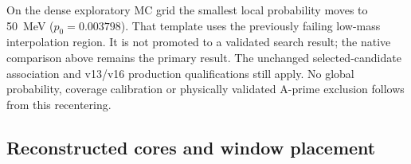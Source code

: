 On the dense exploratory MC grid the smallest local probability moves
to 50~MeV ($p_0=0.003798$). That template uses the previously failing
low-mass interpolation region. It is not promoted to a validated
search result; the native comparison above remains the primary result.
The unchanged selected-candidate association and v13/v16 production
qualifications still apply. No global probability, coverage calibration
or physically validated A-prime exclusion follows from this recentering.

\clearpage
\subsection{Reconstructed cores and window placement}
